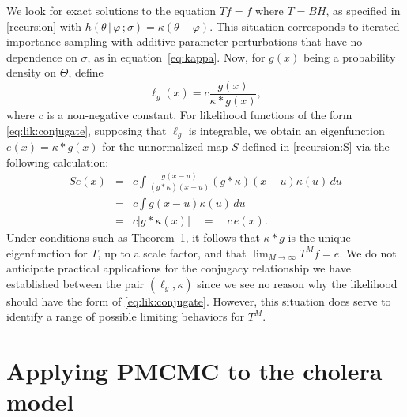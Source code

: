 \documentclass[11pt]{article}
\newcommand{\bbTheta}{\Theta}
\newcommand\lik{\ell}
\newcommand\Thetaspace{{\bbTheta}}
\newcommand\given{{\, | \,}}
\newcommand\giventh{\,;}
\begin{document}
We look for exact solutions to the equation $Tf=f$ where $T=BH$, as specified in \eqref{recursion} with $h(\theta\given\varphi\giventh\sigma)= \kappa(\theta-\varphi)$.
This situation corresponds to iterated importance sampling with additive parameter perturbations that have no dependence on $\sigma$, as in equation~\eqref{eq:kappa}. 
Now, for $g(x)$ being a probability density on $\Thetaspace$, define
 \begin{equation} \label{eq:lik:conjugate}
 \lik_g(x) = c \frac{g(x)}{\kappa * g (x)},
\end{equation}
where $c$ is a non-negative constant. 
For likelihood functions of the form \eqref{eq:lik:conjugate}, supposing that $\lik_g$ is integrable, we obtain an eigenfunction $e(x)=\kappa*g(x)$ for the unnormalized map $S$ defined in \eqref{recursion:S} via the following calculation:
\begin{eqnarray}
Se(x)&=& c \int \frac{g(x-u)}{(g *\kappa)(x-u)} (g*\kappa)(x-u) \kappa(u)\, du \\
&=& c \int g(x-u) \kappa(u)\, du \\
&=& c \big[ g* \kappa(x) \big]\quad = \quad c \, e(x).
\end{eqnarray}
Under conditions such as Theorem~1, it follows that $\kappa*g$ is the unique eigenfunction for $T$, up to a scale factor, and that $\lim_{M\to\infty}T^Mf=e$.
We do not anticipate practical applications for the conjugacy relationship we have established between the pair $(\lik_g,\kappa)$ since we see no reason why the likelihood should have the form of \eqref{eq:lik:conjugate}. 
However, this situation does serve to identify a range of possible limiting behaviors for $T^M$.

\section{Applying PMCMC to the cholera model}
\end{document}
